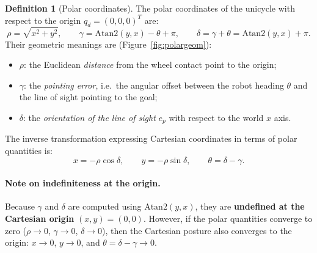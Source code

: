 \documentclass[11pt,a4paper]{article}
\def\bm#1{#1}%
\theoremstyle{definition}
\newtheorem{definition}{Definition}[section]
\theoremstyle{plain}
\theoremstyle{remark}
\begin{document}
\begin{definition}[Polar coordinates]
The polar coordinates of the unicycle with respect to the origin $\bm q_d=(0,0,0)^T$ are:
\[
\rho=\sqrt{x^2+y^2},\qquad
\gamma=\mathrm{Atan2}(y,x)-\theta+\pi,\qquad
\delta=\gamma+\theta=\mathrm{Atan2}(y,x)+\pi .
\]
Their geometric meanings are (Figure~\ref{fig:polargeom}):
\begin{itemize}[leftmargin=*,nosep]
\item $\rho$: the Euclidean \emph{distance} from the wheel contact point to the origin;
\item $\gamma$: the \emph{pointing error}, i.e.\ the angular offset between the robot heading $\theta$ and the line of sight pointing to the goal;
\item $\delta$: the \emph{orientation of the line of sight} $\bm e_p$ with respect to the world $x$ axis.
\end{itemize}
\end{definition}

The inverse transformation expressing Cartesian coordinates in terms of polar quantities is:
\[
x=-\rho\cos\delta,\qquad y=-\rho\sin\delta,\qquad \theta=\delta-\gamma .
\]

\paragraph{Note on indefiniteness at the origin.}
Because $\gamma$ and $\delta$ are computed using $\mathrm{Atan2}(y,x)$, they are \textbf{undefined at the Cartesian origin} $(x,y)=(0,0)$. However, if the polar quantities converge to zero ($\rho\to0$, $\gamma\to0$, $\delta\to0$), then the Cartesian posture also converges to the origin: $x\to0$, $y\to0$, and $\theta=\delta-\gamma\to0$.
\end{document}
